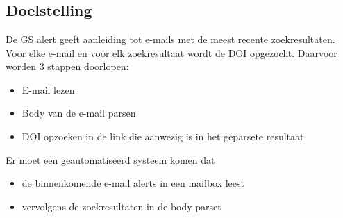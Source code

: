 
\chapter{}%
\label{ch:parsezoekresultaat}

\section{Doelstelling}
De GS alert geeft aanleiding tot e-mails met de meest recente zoekresultaten. Voor
elke e-mail en voor elk zoekresultaat wordt de DOI opgezocht. Daarvoor worden 3
stappen doorlopen:
\begin{itemize}
    \item E-mail lezen
    \item Body van de e-mail parsen
    \item DOI opzoeken in de link die aanwezig is in het geparsete resultaat
\end{itemize}
Er moet een geautomatiseerd systeem komen dat 
\begin{itemize}
    \item de binnenkomende e-mail alerts in een mailbox leest
    \item vervolgens de zoekresultaten in de body parset
\end{itemize}

